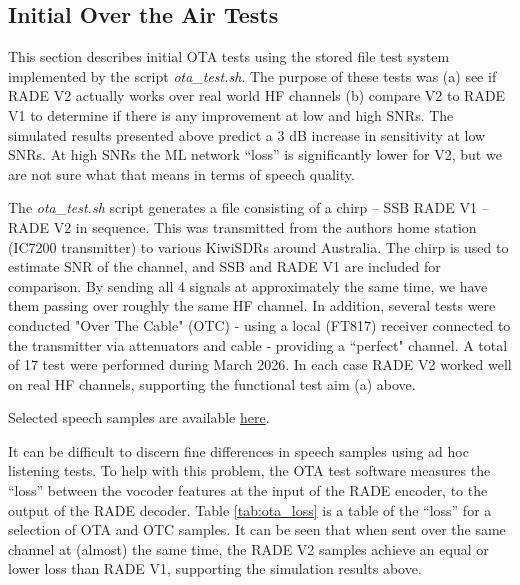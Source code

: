 \documentclass{article}
\begin{document}
\subsection{Initial Over the Air Tests}

This section describes initial OTA tests using the stored file test system implemented by the script \emph{ota\_test.sh}.  The purpose of these tests was (a) see if RADE V2 actually works over real world HF channels (b) compare V2 to RADE V1 to determine if there is any improvement at low and high SNRs.  The simulated results presented above predict a 3 dB increase in sensitivity at low SNRs.  At high SNRs the ML network “loss” is significantly lower for V2, but we are not sure what that means in terms of speech quality.

The \emph{ota\_test.sh} script generates a file consisting of a chirp – SSB RADE V1 – RADE V2 in sequence. This was transmitted from the authors home station (IC7200 transmitter) to various KiwiSDRs around Australia.  The chirp is used to estimate SNR of the channel, and SSB and RADE V1 are included for comparison. By sending all 4 signals at approximately the same time, we have them passing over roughly the same HF channel. In addition, several tests were conducted "Over The Cable" (OTC) - using a local (FT817) receiver connected to the transmitter via attenuators and cable - providing a ``perfect" channel.  A total of 17 test were performed during March 2026. In each case RADE V2 worked well on real HF channels, supporting the functional test aim (a) above.

Selected speech samples are available \href{https://freedv.org/david-march-2026-ai-v1-c-port-qa-claude-code-v2-eoo-and-snr-stored-file-ota-tests/}{here}.

It can be difficult to discern fine differences in speech samples using ad hoc listening tests. To help with this problem, the OTA test software measures the “loss” between the vocoder features at the input of the RADE encoder, to the output of the RADE decoder.  Table \ref{tab:ota_loss} is a table of the “loss” for a selection of OTA and OTC samples. It can be seen that when sent over the same channel at (almost) the same time, the RADE V2 samples achieve an equal or lower loss than RADE V1, supporting the simulation results above.
\end{document}
